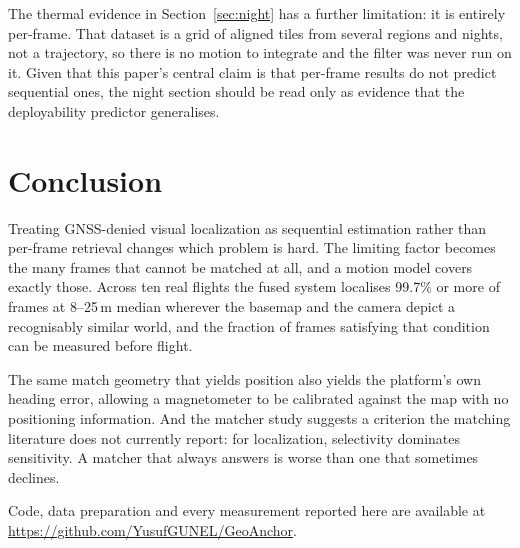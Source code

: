 \documentclass[conference]{IEEEtran}
\begin{document}
The thermal evidence in Section~\ref{sec:night} has a further limitation: it
is entirely per-frame.
That dataset is a grid of aligned tiles from several regions and nights, not a
trajectory, so there is no motion to integrate and the filter was never run on
it. Given that this paper's central claim is that per-frame results
do not predict sequential ones, the night section should be read only as
evidence that the deployability predictor generalises.

\section{Conclusion}

Treating GNSS-denied visual localization as sequential estimation rather than
per-frame retrieval changes which problem is hard. The limiting factor becomes
the many frames that cannot be matched at all, and a motion model covers
exactly those. Across ten real flights the fused
system localises 99.7\% or more of frames at 8--25\,m median wherever the
basemap and the camera depict a recognisably similar world, and the fraction of
frames satisfying that condition can be measured before flight.

The same match geometry that yields position also yields the platform's own
heading error, allowing a magnetometer to be calibrated against the map with no
positioning information. And the matcher study suggests a criterion the
matching literature does not currently report: for localization, selectivity
dominates sensitivity. A matcher that always answers is worse than one that
sometimes declines.

Code, data preparation and every measurement reported here are available at
\url{https://github.com/YusufGUNEL/GeoAnchor}.
\end{document}
